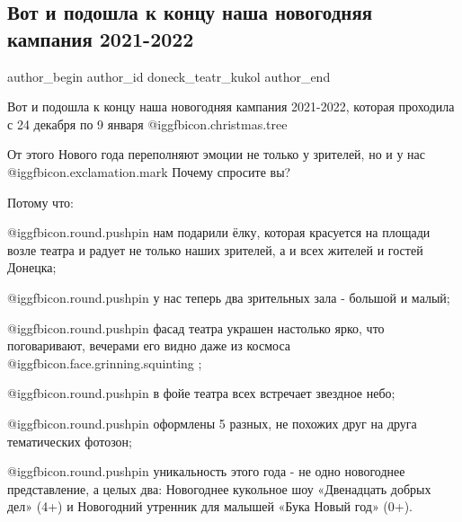  
 
 
 
 
\subsection{Вот и подошла к концу наша новогодняя кампания 2021-2022}
\label{sec:10_01_2022.vk.doneck_teatr_kukol.1.novgod_kampania}

\ifcmt
 author_begin
   author_id doneck_teatr_kukol
 author_end
\fi

Вот и подошла к концу наша новогодняя кампания 2021-2022, которая проходила с
24 декабря по 9 января  @igg{fbicon.christmas.tree} 

От этого Нового года переполняют эмоции не только у зрителей, но и у нас @igg{fbicon.exclamation.mark}
Почему спросите вы?


Потому что:

 @igg{fbicon.round.pushpin} нам подарили ёлку, которая красуется на площади возле театра и радует не
только наших зрителей, а и всех жителей и гостей Донецка;

 @igg{fbicon.round.pushpin} у нас теперь два зрительных зала - большой и малый;

 @igg{fbicon.round.pushpin} фасад театра украшен настолько ярко, что поговаривают, вечерами его видно
даже из космоса  @igg{fbicon.face.grinning.squinting} ;

 @igg{fbicon.round.pushpin} в фойе театра всех встречает звездное небо;

 @igg{fbicon.round.pushpin} оформлены 5 разных, не похожих друг на друга тематических фотозон;

 @igg{fbicon.round.pushpin} уникальность этого года - не одно новогоднее представление, а целых два:
Новогоднее кукольное шоу «Двенадцать добрых дел» (4+) и Новогодний утренник для
малышей «Бука Новый год» (0+).


